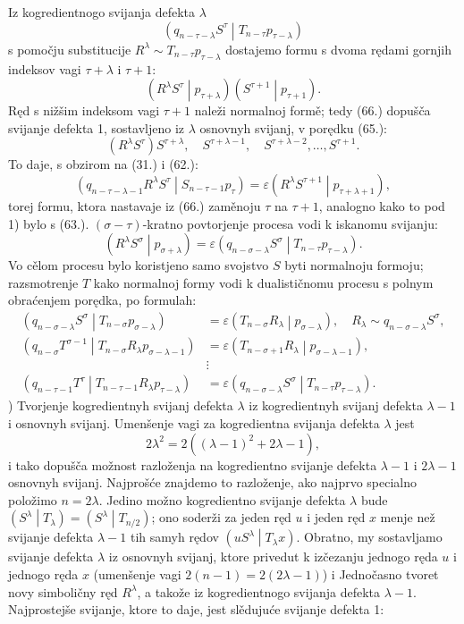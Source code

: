 \documentclass[11pt]{article}
\newcommand{\pair}[2]{\left(#1\middle|#2\right)}
\newcommand{\eps}{\varepsilon}
\begin{document}
Iz kogredientnogo svijanja defekta $\lambda$
\[
 \pair{q_{n-\tau-\lambda}S^\tau}{T_{n-\tau}p_{\tau-\lambda}}
\]
s pomočju substitucije $R^\lambda\sim T_{n-\tau}p_{\tau-\lambda}$ dostajemo formu s dvoma rędami gornjih indeksov vagi $\tau+\lambda$ i $\tau+1$:
\begin{equation}
 \pair{R^\lambda S^\tau}{p_{\tau+\lambda}}\pair{S^{\tau+1}}{p_{\tau+1}}.
\tag{66}
\end{equation}
Ręd s nižšim indeksom vagi $\tau+1$ naleži normalnoj formě; tedy (66.) dopušča svijanje defekta 1, sostavljeno iz $\lambda$ osnovnyh svijanj, v porędku (65.):
\[
 (R^\lambda S^\tau)S^{\tau+\lambda},\quad S^{\tau+\lambda-1},\quad S^{\tau+\lambda-2},\ldots,S^{\tau+1}.
\]
To daje, s obzirom na (31.) i (62.):
\[
 \pair{q_{n-\tau-\lambda-1}R^\lambda S^\tau}{S_{n-\tau-1}p_\tau}
 =\eps\pair{R^\lambda S^{\tau+1}}{p_{\tau+\lambda+1}},
\]
torej formu, ktora nastavaje iz (66.) zaměnoju $\tau$ na $\tau+1$, analogno kako to pod 1) bylo s (63.). $(\sigma-\tau)$-kratno povtorjenje procesa vodi k iskanomu svijanju:
\[
 \pair{R^\lambda S^\sigma}{p_{\sigma+\lambda}}
 =\eps\pair{q_{n-\sigma-\lambda}S^\sigma}{T_{n-\tau}p_{\tau-\lambda}}.
\]
Vo cělom procesu bylo koristjeno samo svojstvo $S$ byti normalnoju formoju; razsmotrenje $T$ kako normalnoj formy vodi k dualističnomu procesu s polnym obraćenjem porędka, po formulah:
\begin{align*}
\pair{q_{n-\sigma-\lambda}S^\sigma}{T_{n-\sigma}p_{\sigma-\lambda}}&=\eps\pair{T_{n-\sigma}R_\lambda}{p_{\sigma-\lambda}},\quad R_\lambda\sim q_{n-\sigma-\lambda}S^\sigma,\\
\pair{q_{n-\sigma}T^{\sigma-1}}{T_{n-\sigma}R_\lambda p_{\sigma-\lambda-1}}&=\eps\pair{T_{n-\sigma+1}R_\lambda}{p_{\sigma-\lambda-1}},\\
&\vdots\\
\pair{q_{n-\tau-1}T^\tau}{T_{n-\tau-1}R_\lambda p_{\tau-\lambda}}&=\eps\pair{q_{n-\sigma-\lambda}S^\sigma}{T_{n-\tau}p_{\tau-\lambda}}.
\end{align*}
) Tvorjenje kogredientnyh svijanj defekta $\lambda$ iz kogredientnyh svijanj defekta $\lambda-1$ i osnovnyh svijanj. Umenšenje vagi za kogredientna svijanja defekta $\lambda$ jest
\[
2\lambda^2=2((\lambda-1)^2+2\lambda-1),
\]
i tako dopušča možnost razloženja na kogredientno svijanje defekta $\lambda-1$ i $2\lambda-1$ osnovnyh svijanj. Najprošće znajdemo to razloženje, ako najprvo specialno položimo $n=2\lambda$. Jedino možno kogredientno svijanje defekta $\lambda$ bude $\pair{S^\lambda}{T_\lambda}=\pair{S^\lambda}{T_{n/2}}$; ono soderži za jeden ręd $u$ i jeden ręd $x$ menje než svijanje defekta $\lambda-1$ tih samyh rędov $\pair{uS^\lambda}{T_\lambda x}$. Obratno, my sostavljamo svijanje defekta $\lambda$ iz osnovnyh svijanj, ktore privedut k izčezanju jednogo ręda $u$ i jednogo ręda $x$ (umenšenje vagi $2(n-1)=2(2\lambda-1)$) i Jednočasno tvoret novy simboličny ręd $R^\lambda$, a takože iz kogredientnogo svijanja defekta $\lambda-1$. Najprostejše svijanje, ktore to daje, jest slědujuće svijanje defekta 1:
\end{document}
